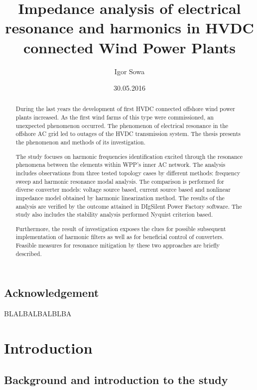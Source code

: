 \documentclass[12pt]{report} %
\title{Impedance analysis of electrical resonance and harmonics in HVDC connected Wind Power Plants}
\author{Igor Sowa}
\date{30.05.2016}
\begin{document}
\maketitle
\newpage

\begin{abstract}

During the last years the development of first HVDC connected offshore wind power plants increased. As the first wind farms of this type were commissioned, an unexpected phenomenon occurred. The phenomenon of electrical resonance in the offshore AC grid led to outages of the HVDC transmission system. The thesis presents the phenomenon and methods of its investigation.

The study focuses on harmonic frequencies identification excited through the resonance phenomena between the elements within WPP's inner AC network. The analysis includes observations from three tested topology cases by different methods: frequency sweep and harmonic resonance modal analysis. The comparison is performed for diverse converter models: voltage source based, current source based and nonlinear impedance model obtained by harmonic linearization method. The results of the analysis are verified by the outcome attained in DIgSilent Power Factory software. The study also includes the stability analysis performed Nyquist criterion based.

Furthermore, the result of investigation exposes the clues for possible subsequent implementation of harmonic filters as well as for beneficial control of converters. Feasible measures for resonance mitigation by these two approaches are briefly described.
\end{abstract}
\newpage

\section*{Acknowledgement}
BLALBALBALBLBA
\newpage

\tableofcontents
\newpage
{}

\chapter{Introduction}

\section{Background and introduction to the study} \label{sec:motivation}
\end{document}
